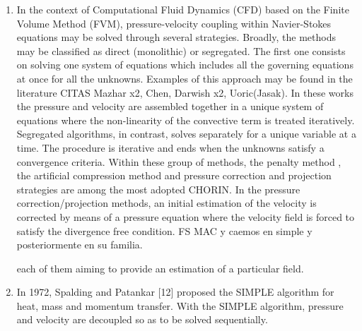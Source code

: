 \documentclass[final,3p,times,11pt,onecolumn]{myElsarticle}
\numberwithin{equation}{section}
\begin{document}
\begin{enumerate}
\item In the context of Computational Fluid Dynamics (CFD) based on the Finite Volume Method (FVM), pressure-velocity coupling
within Navier-Stokes equations may be solved through several strategies. Broadly, the methods may be classified as direct (monolithic)
or segregated. The first one consists on solving one system of equations which includes all the governing equations at once for all the unknowns. Examples of this approach may be found in the literature {\color{red} CITAS Mazhar x2, Chen, Darwish x2, Uoric(Jasak)}. In these works the pressure and velocity are assembled together in a unique system of equations where the non-linearity of the convective term is treated iteratively. Segregated algorithms, in contrast, solves separately for a unique variable at a time. The procedure is iterative and ends when the unknowns satisfy a convergence criteria. Within these group of methods, the penalty method \cite{temam1968methode}, the artificial compression method \cite{harten1977artificial} and pressure correction and projection strategies are among the most adopted {\color{red} CHORIN}.
In the pressure correction/projection methods, an initial estimation of the velocity is corrected by means of a pressure equation where the velocity field is forced to satisfy the divergence free condition. FS MAC y caemos en simple y posteriormente en su familia.



each of them aiming to provide an estimation of a particular field.





\item In 1972, Spalding and Patankar [12] proposed the SIMPLE algorithm for heat, mass and momentum transfer. With the SIMPLE
algorithm, pressure and velocity are decoupled so as to be solved sequentially. 


\end{enumerate}
\end{document}
